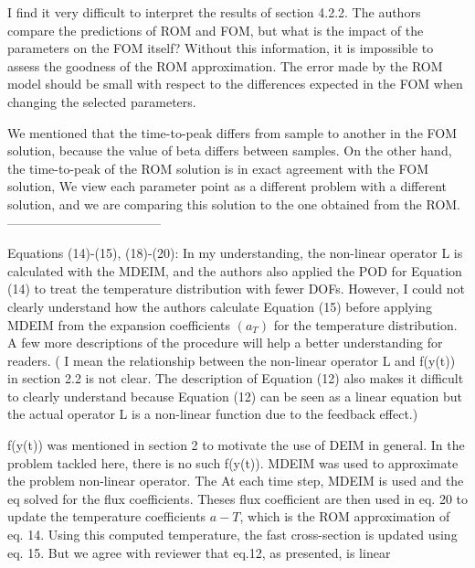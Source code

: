 \documentclass[10pt]{article}
\begin{document}
\begin{response}
{I find it very difficult to interpret the results of section 4.2.2. The authors compare the predictions of ROM and FOM, but what is the impact of the parameters on the FOM itself? Without this information, it is impossible to assess the goodness of the ROM approximation. The error made by the ROM model should be small with respect to the differences expected in the FOM when changing the selected parameters.}

We mentioned that the time-to-peak differs from sample to another in the FOM solution, 
because the value of beta differs between samples.
On the other hand, the time-to-peak of the ROM solution is in exact agreement with the FOM solution,
We view each parameter point as a different problem with a different solution, and we are comparing this solution to the one obtained from the ROM.
------------------------------------
\end{response}

\begin{response}
	{
		Equations (14)-(15), (18)-(20):
		In my understanding, the non-linear operator L is calculated with the MDEIM, and the authors also applied the POD for Equation (14) to treat the temperature distribution with fewer DOFs.
		However, I could not clearly understand how the authors calculate Equation (15) before applying MDEIM from the expansion coefficients $(a_T)$ for the temperature distribution. A few more descriptions of the procedure will help a better understanding for readers.
		( I mean the relationship between the non-linear operator L and f(y(t)) in section 2.2 is not clear. The description of Equation (12) also makes it difficult to clearly understand because Equation (12) can be seen as a linear equation but the actual operator L is a non-linear function due to the feedback effect.)
	}

f(y(t)) was mentioned in section 2 to motivate the use of DEIM in general. In the problem tackled here, there is no such f(y(t)). MDEIM was used to approximate the problem non-linear operator.
The At each time step, MDEIM is used and the eq solved for the flux coefficients. Theses flux coefficient are then used in eq. 20 to update the temperature coefficients $a-T$, which is the ROM approximation of eq. 14.
Using this computed temperature, the fast cross-section is updated using eq. 15.
But we agree with reviewer that eq.12, as presented, is linear 


\end{response}
\end{document}
